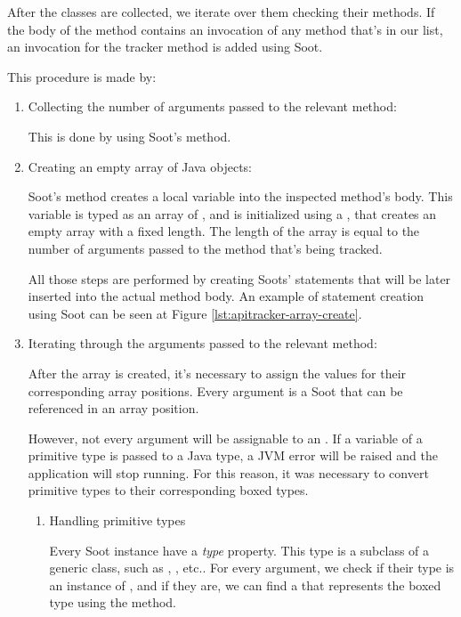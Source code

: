 After the classes are collected, we iterate over them checking their methods. If the body of the method contains an invocation of any method that's in our  list, an invocation for the  tracker method is added using Soot. 

This procedure is made by:

\begin{enumerate}
    \item Collecting the number of arguments passed to the relevant method:
    
    This is done by using Soot's  method.
    \item Creating an empty array of Java objects: 
    
    Soot's  method creates a local variable into the inspected method's body. This variable is typed as an array of , and is initialized using a , that creates an empty array with a fixed length. The length of the array is equal to the number of arguments passed to the method that's being tracked. 

    All those steps are performed by creating Soots' statements that will be later inserted into the actual method body. An example of statement creation using Soot can be seen at Figure \ref{lst:apitracker-array-create}.
   
    \item Iterating through the arguments passed to the relevant method: 

    After the array is created, it's necessary to assign the values for their corresponding array positions. Every argument is a Soot  that can be referenced in an array position.

    However, not every argument will be assignable to an . If a variable of a primitive type is passed to a Java  type, a JVM error will be raised and the application will stop running. For this reason, it was necessary to convert primitive types to their corresponding boxed types.

    \begin{enumerate}
        \item Handling primitive types

        Every Soot  instance have a \textit{type} property. This type is a subclass of a generic  class, such as , , etc.. For every argument, we check if their type is an instance of , and if they are, we can find a  that represents the boxed type using the  method.


\end{enumerate}
\end{enumerate}

